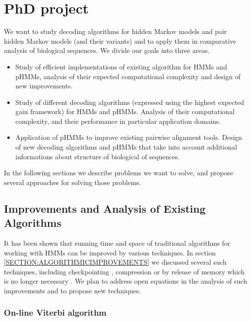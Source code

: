 \chapter{PhD project}

We want to study decoding algorithms for hidden Markov models and pair hidden
Markov models (and their variants) and to apply them in comparative analysis
of biological sequences. We divide our goals into three areas.
\begin{itemize}
\item Study of efficient implementations of existing algorithm for HMMs and
pHMMs, analysis of their expected computational complexity and design of  new
improvements.

\item Study of different decoding algorithms (expressed using the highest
expected gain framework) for HMMs and pHMMs. Analysis of their computational
complexity, and their performance in particular application domains.    

\item Application of pHMMs to improve existing pairwise alignment
tools. Design of new decoding algorithms and pHMMs that take into
account additional informations about structure of biological of sequences.
\end{itemize}
In the following sections we describe problems we want to solve, and propose several
approaches for solving those problems.


\section{Improvements and Analysis of Existing Algorithms}

It has been shown that running time and space of traditional algorithms for working with HMMs can be
improved by various techniques. In section \ref{SECTION:ALGORITHMICIMPROVEMENTS}
we discussed several such techniques, including checkpointing
\cite{Grice1997}, compression \cite{Lifshits2009} or by release of memory which
is no longer necessary \cite{Sramek2007}. We plan to address open equations in
the analysis of such improvements and to propose new techniques.

\subsection{On-line Viterbi algorithm}

